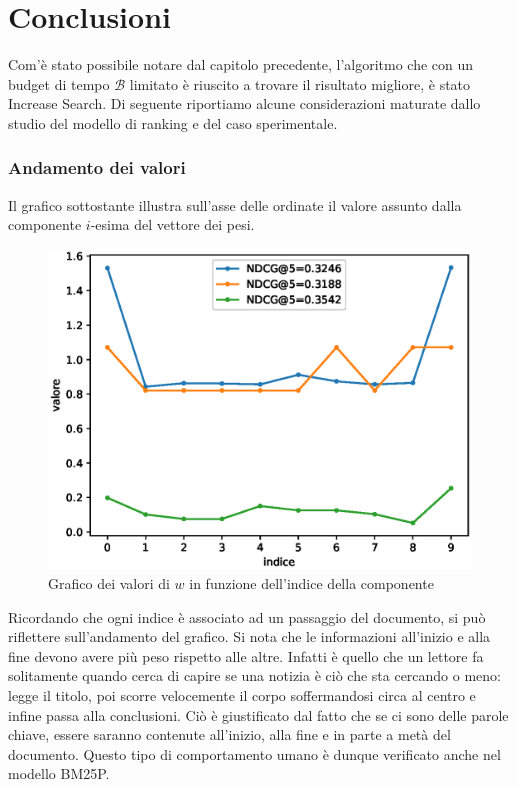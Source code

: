 \chapter{Conclusioni}
Com'è stato possibile notare dal capitolo precedente,
l'algoritmo che con un budget di tempo $\mathcal{B}$ limitato è riuscito a trovare
il risultato migliore, è stato Increase Search.
Di seguente riportiamo alcune considerazioni maturate
dallo studio del modello di ranking e del caso sperimentale.

\subsection{Andamento dei valori}
Il grafico sottostante illustra sull'asse delle ordinate il valore assunto
dalla componente $i$-esima del vettore dei pesi.

\begin{figure}[h!]
	\centering
	\includegraphics[width=0.7\linewidth]{figure/w_vectors}
	\caption[Distribuzione dei valori di w]{Grafico dei valori di $w$ in funzione dell'indice della componente}
	\label{fig:wvectors}
\end{figure}

Ricordando che ogni indice è associato ad un passaggio del documento,
si può riflettere sull'andamento del grafico.
Si nota che le informazioni all'inizio e alla fine
devono avere più peso rispetto alle altre. Infatti è quello che un lettore
fa solitamente quando cerca di capire se una notizia è ciò che sta cercando o meno:
legge il titolo, poi scorre velocemente il corpo soffermandosi circa al centro e
infine passa alla conclusioni. Ciò è giustificato
dal fatto che se ci sono delle parole chiave,
essere saranno contenute all'inizio, alla fine e in parte a metà del documento.
Questo tipo di comportamento umano è dunque
verificato anche nel modello BM25P.

